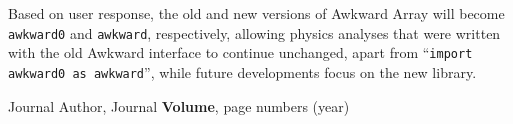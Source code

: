 \documentclass{webofc}
\begin{document}
Based on user response, the old and new versions of Awkward Array will become \texttt{awkward0} and \texttt{awkward}, respectively, allowing physics analyses that were written with the old Awkward interface to continue unchanged, apart from ``\texttt{import awkward0 as awkward}'', while future developments focus on the new library.



% 
%
\begin{thebibliography}{}
Journal Author, Journal \textbf{Volume}, page numbers (year)
\end{thebibliography}
\end{document}
